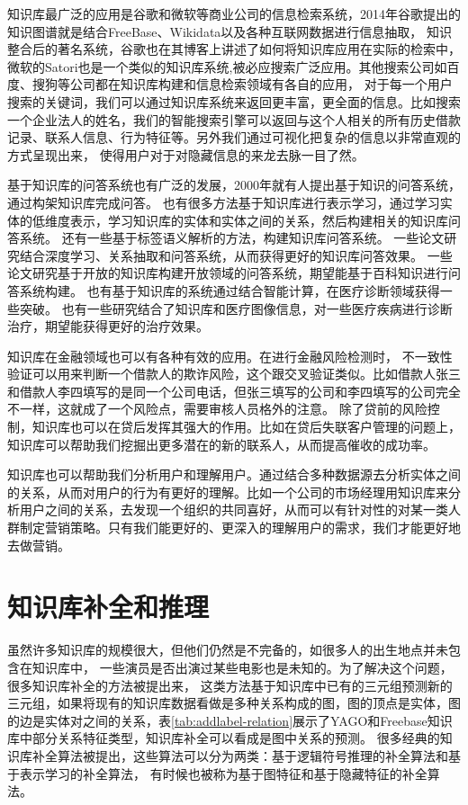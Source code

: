 知识库最广泛的应用是谷歌和微软等商业公司的信息检索系统，2014年谷歌提出的知识图谱\cite{Dong2014KnowledgeVA}就是结合FreeBase、Wikidata以及各种互联网数据进行信息抽取，
知识整合后的著名系统，谷歌也在其博客上讲述了如何将知识库应用在实际的检索中，
微软的Satori也是一个类似的知识库系统,被必应搜索广泛应用。其他搜索公司如百度、搜狗等公司都在知识库构建和信息检索领域有各自的应用，
对于每一个用户搜索的关键词，我们可以通过知识库系统来返回更丰富，更全面的信息。比如搜索一个企业法人的姓名，我们的智能搜索引擎可以返回与这个人相关的所有历史借款记录、联系人信息、行为特征等。另外我们通过可视化把复杂的信息以非常直观的方式呈现出来， 使得用户对于对隐藏信息的来龙去脉一目了然。

基于知识库的问答系统也有广泛的发展，2000年就有人提出基于知识的问答系统\cite{HERMJAKOB2000KnowledgeBasedQA}，通过构架知识库完成问答。
也有很多方法基于知识库进行表示学习\cite{Yang2014JointRE}，通过学习实体的低维度表示，学习知识库的实体和实体之间的关系，然后构建相关的知识库问答系统。
还有一些基于标签语义解析的方法，构建知识库问答系统\cite{Yih2016TheVO}。
一些论文\cite{Yu2017ImprovedNR}研究结合深度学习、关系抽取和问答系统，从而获得更好的知识库问答效果。
一些论文\cite{KeySun2016OpenKB}研究基于开放的知识库构建开放领域的问答系统，期望能基于百科知识进行问答系统构建。
也有基于知识库的系统通过结合智能计算\cite{Pandey2009KnowledgeAI}，在医疗诊断领域获得一些突破。
也有一些研究结合了知识库和医疗图像信息\cite{Halpern2014EvaluationOC}，对一些医疗疾病进行诊断治疗，期望能获得更好的治疗效果。

知识库在金融领域也可以有各种有效的应用。在进行金融风险检测时，
不一致性验证可以用来判断一个借款人的欺诈风险，这个跟交叉验证类似。比如借款人张三和借款人李四填写的是同一个公司电话，但张三填写的公司和李四填写的公司完全不一样，这就成了一个风险点，需要审核人员格外的注意。
除了贷前的风险控制，知识库也可以在贷后发挥其强大的作用。比如在贷后失联客户管理的问题上，知识库可以帮助我们挖掘出更多潜在的新的联系人，从而提高催收的成功率。

知识库也可以帮助我们分析用户和理解用户。通过结合多种数据源去分析实体之间的关系，从而对用户的行为有更好的理解。比如一个公司的市场经理用知识库来分析用户之间的关系，去发现一个组织的共同喜好，从而可以有针对性的对某一类人群制定营销策略。只有我们能更好的、更深入的理解用户的需求，我们才能更好地去做营销。

\section{知识库补全和推理}
虽然许多知识库的规模很大，但他们仍然是不完备的，如很多人的出生地点并未包含在知识库中，
一些演员是否出演过某些电影也是未知的。为了解决这个问题，很多知识库补全的方法被提出来，
这类方法基于知识库中已有的三元组预测新的三元组，如果将现有的知识库数据看做是多种关系构成的图，图的顶点是实体，图的边是实体对之间的关系，表\ref{tab:addlabel-relation}展示了YAGO和Freebase知识库中部分关系特征类型，知识库补全可以看成是图中关系的预测。
很多经典的知识库补全算法被提出，这些算法可以分为两类：基于逻辑符号推理的补全算法和基于表示学习的补全算法，
有时候也被称为基于图特征和基于隐藏特征的补全算法。


